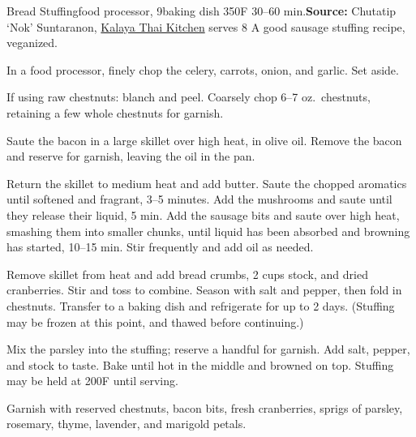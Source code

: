 \begin{recipe}{Bread Stuffing}{food processor, 9\inch{}\inch baking dish \hfill 350\0F \hfill 30--60 min.}{\textbf{Source:} Chutatip `Nok' Suntaranon, \href{https://www.kalaya.net/}{Kalaya Thai Kitchen} \hfill serves 8}
 \freeform A good sausage stuffing recipe, veganized.

 In a food processor, finely chop the celery, carrots, onion, and garlic. Set aside.

 If using raw chestnuts: blanch and peel. Coarsely chop 6--7 oz.\ chestnuts, retaining a few whole chestnuts for garnish.

 Saute the bacon in a large skillet over high heat, in olive oil. Remove the bacon and reserve for garnish, leaving the oil in the pan.

 Return the skillet to medium heat and add butter. Saute the chopped aromatics until softened and fragrant, 3--5 minutes. Add the mushrooms and saute until they release their liquid, 5 min. Add the sausage bits and saute over high heat, smashing them into smaller chunks, until liquid has been absorbed and browning has started, 10--15 min. Stir frequently and add oil as needed.

 Remove skillet from heat and add bread crumbs, 2 cups stock, and dried cranberries. Stir and toss to combine. Season with salt and pepper, then fold in chestnuts. Transfer to a baking dish and refrigerate for up to 2 days. (Stuffing may be frozen at this point, and thawed before continuing.)

 Mix the parsley into the stuffing; reserve a handful for garnish. Add salt, pepper, and stock to taste. Bake until hot in the middle and browned on top. Stuffing may be held at 200\0F until serving.

 \newstep Garnish with reserved chestnuts, bacon bits, fresh cranberries, sprigs of parsley, rosemary, thyme, lavender, and marigold petals.


\end{recipe}
